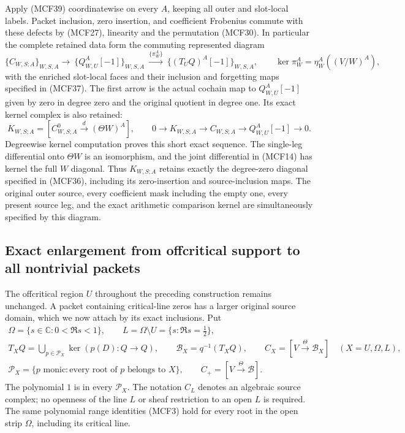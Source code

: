 \documentclass[11pt,a4paper]{article}
\begin{document}
Apply (MCF39) coordinatewise on every $A$, keeping all outer and
slot-local labels.  Packet inclusion, zero insertion, and coefficient
Frobenius commute with these defects by (MCF27), linearity and the
permutation (MCF30).  In particular the complete retained data form
the commuting represented diagram
\[
\{C_{W,S;A}\}_{W,S,A} \longrightarrow\
\{Q_{W,U}^A[-1]\}_{W,S,A}\ \xrightarrow{\{\pi_W^A\}}\
\{(T_UQ)^A[-1]\}_{W,S,A},\qquad
\ker\pi_W^A=\eta_W^A((V/W)^A),
\tag{MCF40}
\]
with the enriched slot-local faces and their inclusion and forgetting
maps specified in (MCF37).  The first arrow is the actual cochain map
to $Q_{W,U}^A[-1]$ given by zero in degree zero and the original
quotient in degree one.  Its exact kernel complex is also retained:
\[
K_{W,S;A}=[C_{W,S;A}^0\xrightarrow{d}(\Theta W)^A],\qquad
0\longrightarrow K_{W,S;A}\longrightarrow C_{W,S;A}
\longrightarrow Q_{W,U}^A[-1]\longrightarrow0.
\tag{MCF40a}
\]
Degreewise kernel computation proves this short exact sequence.
The single-leg differential onto $\Theta W$ is an isomorphism, and
the joint differential in (MCF14) has kernel the full $W$ diagonal.
Thus $K_{W,S;A}$ retains exactly the degree-zero diagonal specified
in (MCF36), including its zero-insertion and source-inclusion maps.
The original outer source,
every coefficient mask including the empty one, every present source
leg, and the exact arithmetic comparison kernel are simultaneously
specified by this diagram.

\subsection{Exact enlargement from offcritical support to all nontrivial packets}

The offcritical region $U$ throughout the preceding construction remains
unchanged.  A packet containing critical-line zeros has a larger original
source domain, which we now attach by its exact inclusions.  Put
\[
\begin{gathered}
\Omega=\{s\in\mathbb C:0<\Re s<1\},\qquad
L=\Omega\setminus U=\{s:\Re s=\tfrac12\},\\
T_XQ=\bigcup_{p\in\mathcal P_X}\ker(p(D):Q\to Q),\qquad
\mathscr B_X=q^{-1}(T_XQ),\qquad
C_X=[V\xrightarrow\Theta\mathscr B_X]\quad(X=U,\Omega,L),\\
\mathcal P_X=\{p\text{ monic}:\text{every root of }p\text{ belongs to }X\},
\qquad C_+=[V\xrightarrow\Theta\mathscr B].
\end{gathered}
\tag{MCF41}
\]
The polynomial $1$ is in every $\mathcal P_X$.  The notation $C_L$
denotes an algebraic source complex; no openness of the line $L$
or sheaf restriction to an open $L$ is required.  The same polynomial
range identities (MCF3) hold for every root in the open strip
$\Omega$, including its critical line.
\end{document}
